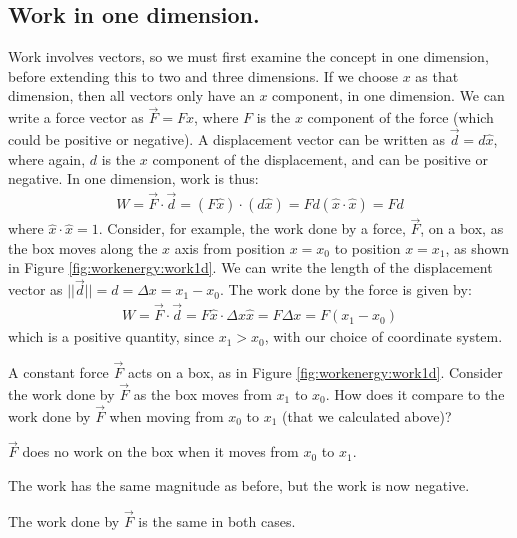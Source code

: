 \subsection{Work in one dimension.}
Work involves vectors, so we must first examine the concept in one dimension, before extending this to two and three dimensions. If we choose $x$ as that dimension, then all vectors only have an $x$ component, in one dimension. We can write a force vector as $\vec F=F\hat x$, where $F$ is the $x$ component of the force (which could be positive or negative). A displacement vector can be written as $\vec d = d \hat x$, where again, $d$ is the $x$ component of the displacement, and can be positive or negative. In one dimension, work is thus:
\begin{align*}
W = \vec F \cdot \vec d = (F\hat x) \cdot ( d\hat x ) = Fd (\hat x\cdot\hat x)=Fd
\end{align*}
where $\hat x \cdot \hat x = 1$. Consider, for example, the work done by a force, $\vec F$, on a box, as the box moves along the $x$ axis from position $x=x_0$ to position $x=x_1$, as shown in Figure \ref{fig:workenergy:work1d}.
We can write the length of the displacement vector as $||\vec d|| =d= \Delta x = x_1-x_0$. The work done by the force is given by:
\begin{align*}
W = \vec F \cdot \vec d = F\hat x\cdot \Delta x\hat x =F\Delta x =F(x_1-x_0) 
\end{align*}
which is a positive quantity, since $x_1 > x_0$, with our choice of coordinate system. 

\begin{checkpoint}
\begin{MCquestion}
{A constant force $\vec F$ acts on a box, as in Figure \ref{fig:workenergy:work1d}. Consider the work done by $\vec F$ as the box moves from $x_1$ to $x_0$. How does it compare to the work done by $\vec F$ when moving from $x_0$ to $x_1$ (that we calculated above)?}
\item $\vec F$ does no work on the box when it moves from $x_0$ to $x_1$. 
\item The work has the same magnitude as before, but the work is now negative. \correct
\item The work done by $\vec F$ is the same in both cases.
\end{MCquestion}
\end{checkpoint}

